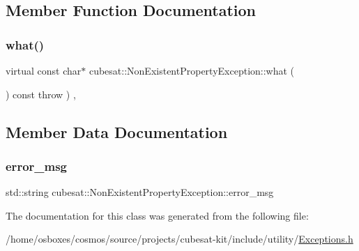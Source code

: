 \subsection{Member Function Documentation}
\mbox{\label{classcubesat_1_1NonExistentPropertyException_a160909d63d9d602a4151e32d8719ec58}} 
\subsubsection{\texorpdfstring{what()}{what()}}
{\footnotesize\ttfamily virtual const char$\ast$ cubesat\+::\+Non\+Existent\+Property\+Exception\+::what (\begin{DoxyParamCaption}{ }\end{DoxyParamCaption}) const throw  ) \hspace{0.3cm}{\ttfamily [inline]}, {\ttfamily [virtual]}}



\subsection{Member Data Documentation}
\mbox{\label{classcubesat_1_1NonExistentPropertyException_a31c5141863cf737c22e0c1f5a8b05375}} 
\subsubsection{\texorpdfstring{error\+\_\+msg}{error\_msg}}
{\footnotesize\ttfamily std\+::string cubesat\+::\+Non\+Existent\+Property\+Exception\+::error\+\_\+msg\hspace{0.3cm}{\ttfamily [private]}}



The documentation for this class was generated from the following file\+:\begin{DoxyCompactItemize}
\item 
/home/osboxes/cosmos/source/projects/cubesat-\/kit/include/utility/\hyperlink{Exceptions_8h}{Exceptions.\+h}\end{DoxyCompactItemize}
